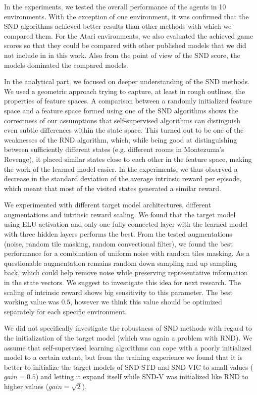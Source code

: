 \documentclass[a4paper,11pt]{elsarticle}
\begin{document}
In the experiments, we tested the overall performance of the agents in 10 environments. With the exception of one environment, it was confirmed that the SND algorithms achieved better results than other methods with which we compared them. For the Atari environments, we also evaluated the achieved game scores so that they could be compared with other published models that we did not include in in this work. Also from the point of view of the SND score, the models dominated the compared models.

In the analytical part, we focused on deeper understanding of the SND methods. We used a geometric approach trying to capture, at least in rough outlines, the properties of feature spaces. A comparison between a randomly initialized feature space and a feature space formed using one of the SND algorithms shows the correctness of our assumptions that self-supervised algorithms can distinguish even subtle differences within the state space. This turned out to be one of the weaknesses of the RND algorithm, which, while being good at distinguishing between sufficiently different states (e.g. different rooms in Montezuma's Revenge), it placed similar states close to each other in the feature space, making the work of the learned model easier. In the experiments, we thus observed a decrease in the standard deviation of the average intrinsic reward per episode, which meant that most of the visited states generated a similar reward.


We experimented with different target model architectures, different augmentations and intrinsic reward scaling. We found that the target model using ELU activation and only one fully connected layer with the learned model with three hidden layers performs the best. 
From the tested augmentations (noise, random tile masking, random convectional filter), we found the best performance for a combination of uniform noise with random tiles masking. As a questionable augmentation remains random down sampling and up sampling back, which could help remove noise while preserving representative information in the state vectors. We suggest to investigate this idea for next research.
The scaling of intrinsic reward shows big sensitivity to this parameter. The best working value was $0.5$, however we think this value should be optimized separately for each specific environment.  

We did not specifically investigate the robustness of SND methods with regard to the initialization of the target model (which was again a problem with RND). We assume that self-supervised learning algorithms can cope with a poorly initialized model to a certain extent, but from the training experience we found that it is better to initialize the target models of SND-STD and SND-VIC to small values ($gain = 0.5$) and letting it expand itself while SND-V was initialized like RND to higher values ($gain = \sqrt{2}$).
\end{document}
